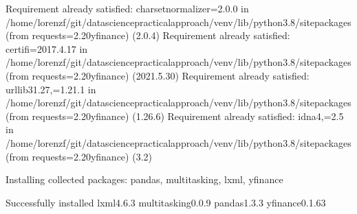 \documentclass[letterpaper,10pt,english]{jupyterBook}
\begin{document}
\begin{sphinxVerbatim}[commandchars=\\\{\}]
Requirement already satisfied: charset\PYGZhy{}normalizer\PYGZti{}=2.0.0 in /home/lorenzf/git/data\PYGZhy{}science\PYGZhy{}practical\PYGZhy{}approach/venv/lib/python3.8/site\PYGZhy{}packages (from requests\PYGZgt{}=2.20\PYGZhy{}\PYGZgt{}yfinance) (2.0.4)
Requirement already satisfied: certifi\PYGZgt{}=2017.4.17 in /home/lorenzf/git/data\PYGZhy{}science\PYGZhy{}practical\PYGZhy{}approach/venv/lib/python3.8/site\PYGZhy{}packages (from requests\PYGZgt{}=2.20\PYGZhy{}\PYGZgt{}yfinance) (2021.5.30)
Requirement already satisfied: urllib3\PYGZlt{}1.27,\PYGZgt{}=1.21.1 in /home/lorenzf/git/data\PYGZhy{}science\PYGZhy{}practical\PYGZhy{}approach/venv/lib/python3.8/site\PYGZhy{}packages (from requests\PYGZgt{}=2.20\PYGZhy{}\PYGZgt{}yfinance) (1.26.6)
Requirement already satisfied: idna\PYGZlt{}4,\PYGZgt{}=2.5 in /home/lorenzf/git/data\PYGZhy{}science\PYGZhy{}practical\PYGZhy{}approach/venv/lib/python3.8/site\PYGZhy{}packages (from requests\PYGZgt{}=2.20\PYGZhy{}\PYGZgt{}yfinance) (3.2)
\end{sphinxVerbatim}

\begin{sphinxVerbatim}[commandchars=\\\{\}]
Installing collected packages: pandas, multitasking, lxml, yfinance
\end{sphinxVerbatim}

\begin{sphinxVerbatim}[commandchars=\\\{\}]
Successfully installed lxml\PYGZhy{}4.6.3 multitasking\PYGZhy{}0.0.9 pandas\PYGZhy{}1.3.3 yfinance\PYGZhy{}0.1.63
\end{sphinxVerbatim}

\begin{sphinxVerbatim}[commandchars=\\\{\}]
\end{sphinxVerbatim}

\begin{sphinxVerbatim}[commandchars=\\\{\}]
\end{sphinxVerbatim}
\end{document}
